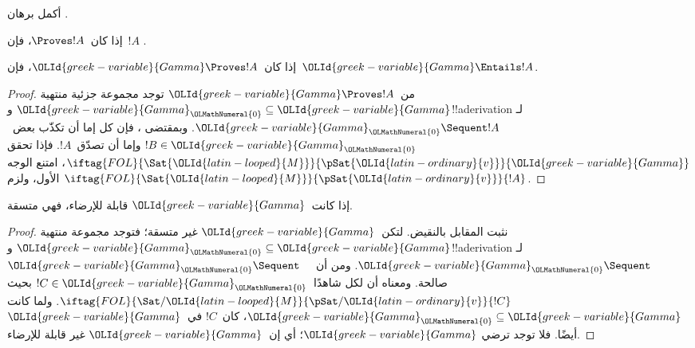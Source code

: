\documentclass[../../../include/open-logic-section]{subfiles}
\begin{document}
\begin{prob}
أكمل برهان .
\end{prob}
\tagendprob

\begin{cor}
إذا كان~$\Proves !A$، فإن~$!A$ .
\end{cor}

\begin{cor}
إذا كان~$\OLId{greek-variable}{Gamma} \Proves !A$، فإن~$\OLId{greek-variable}{Gamma} \Entails !A$.
\end{cor}

\begin{proof}
من~$\OLId{greek-variable}{Gamma} \Proves !A$ توجد مجموعة جزئية منتهية
$\OLId{greek-variable}{Gamma}_\OLMathNumeral{0} \subseteq \OLId{greek-variable}{Gamma}$ و!!a{derivation} لـ
$\OLId{greek-variable}{Gamma}_\OLMathNumeral{0} \Sequent !A$. وبمقتضى ، فإن كل
إما أن تكذّب بعض~$!B \in \OLId{greek-variable}{Gamma}_\OLMathNumeral{0}$ وإما أن تصدّق~$!A$.
فإذا تحقق
$\iftag{FOL}{\Sat{\OLId{latin-looped}{M}}}{\pSat{\OLId{latin-ordinary}{v}}}{\OLId{greek-variable}{Gamma}}$، امتنع الوجه الأول، ولزم
$\iftag{FOL}{\Sat{\OLId{latin-looped}{M}}}{\pSat{\OLId{latin-ordinary}{v}}}{!A}$.
\end{proof}

\begin{cor}
إذا كانت~$\OLId{greek-variable}{Gamma}$ قابلة للإرضاء، فهي متسقة.
\end{cor}

\begin{proof}
نثبت المقابل بالنقيض. لتكن~$\OLId{greek-variable}{Gamma}$ غير متسقة؛ فتوجد مجموعة منتهية
$\OLId{greek-variable}{Gamma}_\OLMathNumeral{0} \subseteq \OLId{greek-variable}{Gamma}$ و!!a{derivation} لـ
$\OLId{greek-variable}{Gamma}_\OLMathNumeral{0} \Sequent \quad$. ومن  أن
$\OLId{greek-variable}{Gamma}_\OLMathNumeral{0} \Sequent \quad$ صالحة.
ومعناه أن لكل
شاهدًا~$!C \in \OLId{greek-variable}{Gamma}_\OLMathNumeral{0}$ بحيث
$\iftag{FOL}{\Sat/{\OLId{latin-looped}{M}}}{\pSat/{\OLId{latin-ordinary}{v}}}{!C}$.
ولما كانت $\OLId{greek-variable}{Gamma}_\OLMathNumeral{0} \subseteq \OLId{greek-variable}{Gamma}$، كان~$!C$ في~$\OLId{greek-variable}{Gamma}$ أيضًا.
فلا توجد  ترضي
$\OLId{greek-variable}{Gamma}$؛ أي إن~$\OLId{greek-variable}{Gamma}$ غير قابلة للإرضاء.
\end{proof}
\end{document}
